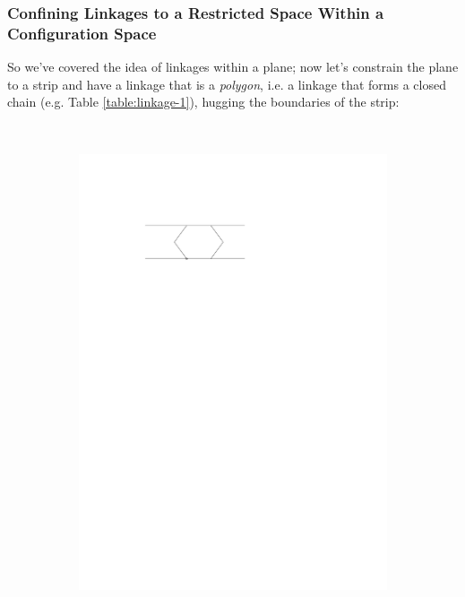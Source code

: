 \subsubsection{Confining Linkages to a Restricted Space Within a Configuration Space}
So we've covered the idea of linkages within a plane; now let's constrain the plane to a strip and have a linkage that is a \textit{polygon}, i.e. a linkage that forms a closed chain (e.g. Table \ref{table:linkage-1}), hugging the boundaries of the strip:
\begin{figure}[h]
\begin{center}
  ~ %
  \begin{subfigure}[b]{0.49\textwidth}
	  \includegraphics[width=\textwidth]{graphics/hexagonInChannelWithPinnedJointRight.pdf}

\end{subfigure}
\end{center}
\end{figure}
